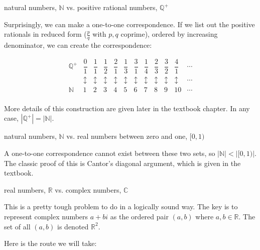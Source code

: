 \documentclass[../gatm_answers.tex]{subfiles}
\begin{document}
\begin{inner_problem}
\item natural numbers, $\mathbb{N}$ vs. positive rational numbers, $\mathbb{Q}^+$
\end{inner_problem}

Surprisingly, we can make a one-to-one correspondence. If we list out the positive rationals in reduced form ($\frac{p}{q}$ with $p,q$ coprime), ordered by increasing denominator, we can create the correspondence:

$$\renewcommand{\arraystretch}{1.6}\begin{array}{cccccccccccc}
\mathbb{Q}^+ & \dfrac{0}{1} & \dfrac{1}{1} & \dfrac{1}{2} & \dfrac{2}{1} & \dfrac{1}{3} & \dfrac{3}{1} & \dfrac{1}{4} & \dfrac{2}{3} & \dfrac{3}{2} & \dfrac{4}{1} & \cdots \\
& \updownarrow & \updownarrow & \updownarrow & \updownarrow & \updownarrow & \updownarrow & \updownarrow & \updownarrow & \updownarrow & \updownarrow & \cdots \\
\mathbb{N} & 1 & 2 & 3 & 4 & 5 & 6 & 7 & 8 & 9 & 10 & \cdots \\
\end{array}$$

More details of this construction are given later in the textbook chapter. In any case, $\left|\mathbb{Q}^+\right| = |\mathbb{N}|.$

\begin{inner_problem}
\item natural numbers, $\mathbb{N}$ vs. real numbers between zero and one, $[0,1)$
\end{inner_problem}

A one-to-one correspondence cannot exist between these two sets, so $\left|\mathbb{N}\right| < \left|[0,1)\right|$. The classic proof of this is Cantor's diagonal argument, which is given in the textbook. 

\begin{inner_problem}
\item real numbers, $\mathbb{R}$ vs. complex numbers, $\mathbb{C}$
\end{inner_problem}

This is a pretty tough problem to do in a logically sound way. The key is to represent complex numbers $a+bi$ as the ordered pair $(a,b)$ where $a,b\in \mathbb{R}$. The set of all $(a,b)$ is denoted $\mathbb{R}^2$.

Here is the route we will take:
\end{document}
